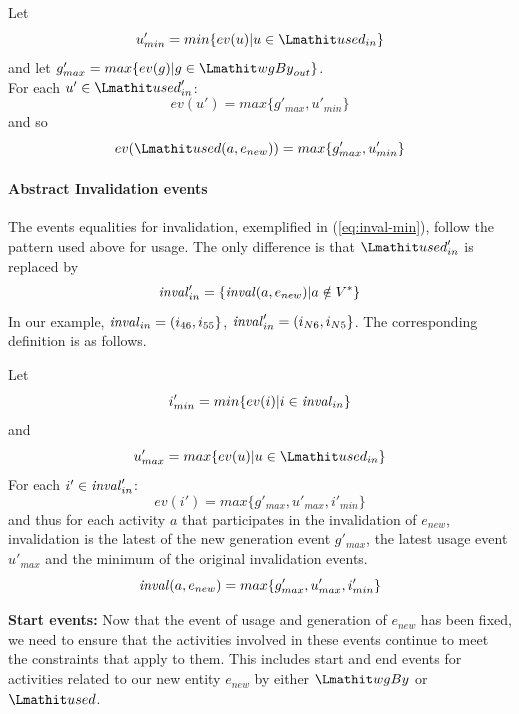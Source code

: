 \vspace*{10pt}
\begin{definition} 
\label{def:abstract-usage-e}


Let
\[u'_{min} = min \{ ev(u) | u \in \used_{in} \}\] and let 
$g'_{max} = max \{ ev(g) | g \in \wgby_{out}\} $.\\
For each $u' \in \used'_{in}$:
\begin{equation*}
ev(u') = max \{ g'_{max} , u'_{min} \}
\end{equation*}
and so
\begin{equation}
ev(\used(a,e_{new})) = max \{ g'_{max} , u'_{min} \}
\end{equation}
\end{definition}

\paragraph*{\textbf{Abstract Invalidation events}}
The events equalities for invalidation, exemplified in (\ref{eq:inval-min}), follow the pattern used above for usage. The only difference is that $\used'_{in}$ is replaced by 
\[ \mathit{inval}'_{in} = \{ \mathit{inval}(a, e_{new}) | a \notin V^* \} \]
In our example, $ \mathit{inval}_{in} = (  i_{46}, i_{55} \}$,  $\mathit{inval}'_{in} = ( i_{N6}, i_{N5} \}$.
%
The corresponding definition is as follows.

\vspace*{10pt}
\begin{definition} 
\label{def:abstract-inv}
Let
\[i'_{min} = min \{ ev(i) | i \in \mathit{inval}_{in} \}\]
and 
\[u'_{max} = max \{ ev(u) | u \in \used_{in} \}\]
For each $i' \in \mathit{inval}'_{in}$:
\[
ev(i') = max \{ g'_{max} , u'_{max},  i'_{min}\}
\]
and thus for each activity $a$  that participates in the invalidation of $e_{new}$, invalidation is the latest of the new generation event $g'_{max}$, the latest usage event $u'_{max}$ and the minimum of the original invalidation events.  
\begin{equation}
\mathit{inval}(a,e_{new}) = max \{ g'_{max} , u'_{max},  i'_{min} \}
\end{equation}
\end{definition}


{\bf Start events:} Now that the event of usage and generation of $e_{new}$ has been fixed, we need to ensure that the activities involved in these events continue to meet the constraints that apply to them. This includes start and end events for activities related to our new entity $e_{new}$ by either $\wgby$ or $\used$.  


